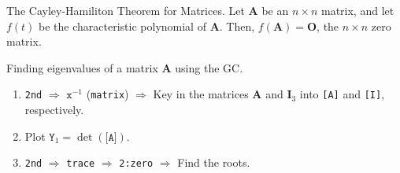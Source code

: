 \begin{corollary}{The Cayley-Hamiliton Theorem for Matrices.}{}
    Let \(\mathbf{A}\) be an \(n\times n\) matrix, and let \(f(t)\) be the characteristic polynomial of \(\mathbf{A}\). Then, \(f(\mathbf{A})=\mathbf{O}\), the \(n\times n\) zero matrix.  
\end{corollary}
\hypertarget{characteristic-polynomial-roots}{}
\begin{GCSkills}{}
    Finding eigenvalues of a matrix \(\mathbf{A}\) using the GC.
    \begin{enumerate}
        \item \texttt{2nd} \(\Longrightarrow\) \(\texttt{x}^{-1}\) (\texttt{matrix}) \(\Longrightarrow\) Key in the matrices \(\mathbf{A}\) and \(\mathbf{I}_3\) into \texttt{[A]} and \texttt{[I]}, respectively. 
        \item Plot \(\texttt{Y}_1=\det{(\texttt{[A]})}\).
        \item \texttt{2nd} \(\Longrightarrow\) \texttt{trace} \(\Longrightarrow\) \texttt{2:zero} \(\Longrightarrow\) Find the roots.
    \end{enumerate}
\end{GCSkills}
